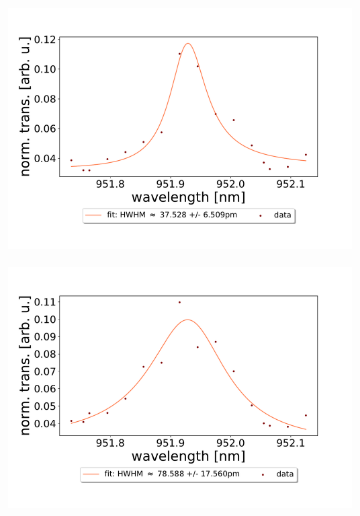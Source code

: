 \begin{figure}[h!]
    \centering
    \begin{subfigure}[b]{0.49\textwidth}
        \includegraphics[width=\textwidth]{figures/results/double fano fits/20250326/33um_M3:M5_fit_1.pdf}
        \caption{}
        \label{fig:33um_M3:M5_fit_1}
    \end{subfigure}
    \begin{subfigure}[b]{0.49\textwidth}
        \includegraphics[width=\textwidth]{figures/results/double fano fits/20250326/33um_M3:M5_fit_2.pdf}
        \caption{}
        \label{fig:33um_M3:M5_fit_2}
    \end{subfigure}
    \begin{subfigure}[b]{0.49\textwidth}

\end{subfigure}
\end{figure}
